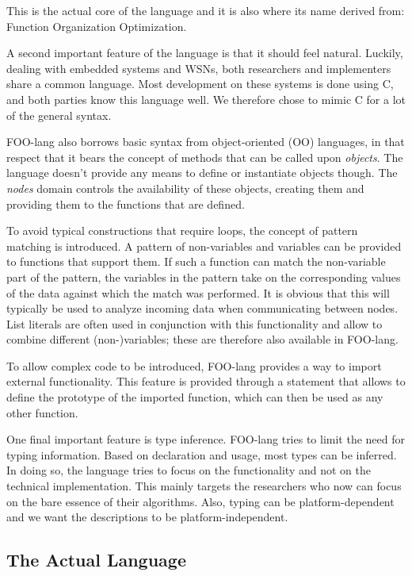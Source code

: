 \documentclass[conference]{IEEEtran}
\begin{document}
This is the actual core of the language and it is also where its name derived
from: Function Organization Optimization.

A second important feature of the language is that it should feel natural.
Luckily, dealing with embedded systems and WSNs, both researchers and
implementers share a common language. Most development on these systems is done
using C, and both parties know this language well. We therefore chose to mimic
C for a lot of the general syntax.

FOO-lang also borrows basic syntax from object-oriented (OO) languages, in that
respect that it bears the concept of methods that can be called upon
\emph{objects}. The language doesn't provide any means to define or instantiate
objects though. The \emph{nodes} domain controls the availability of these
objects, creating them and providing them to the functions that are defined.

To avoid typical constructions that require loops, the concept of pattern
matching is introduced. A pattern of non-variables and variables can be
provided to functions that support them. If such a function can match the
non-variable part of the pattern, the variables in the pattern take on the
corresponding values of the data against which the match was performed. It is
obvious that this will typically be used to analyze incoming data when
communicating between nodes. List literals are often used in conjunction with
this functionality and allow to combine different (non-)variables; these are
therefore also available in FOO-lang.

To allow complex code to be introduced, FOO-lang provides a way to import
external functionality. This feature is provided through a statement that
allows to define the prototype of the imported function, which can then be used
as any other function.

One final important feature is type inference. FOO-lang tries to limit the need
for typing information. Based on declaration and usage, most types can be
inferred. In doing so, the language tries to focus on the functionality and not
on the technical implementation. This mainly targets the researchers who now
can focus on the bare essence of their algorithms. Also, typing can be
platform-dependent and we want the descriptions to be platform-independent.

\subsection{The Actual Language}
\label{subsection:language}
\end{document}
